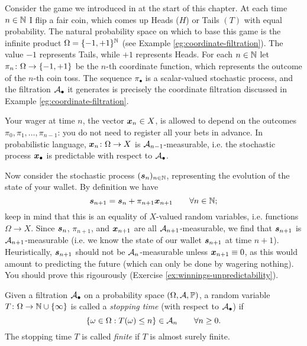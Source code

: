 \begin{example}\label{eg:gambling-filtrations}
  Consider the game we introduced in at the start of this chapter.
  At each time $n \in \mathbb{N}$ I flip a fair coin, which comes up Heads ($H$) or Tails $(T)$ with equal probability.
  The natural probability space on which to base this game is the infinite product $\Omega = \{-1,+1\}^{\mathbb{N}}$ (see Example \ref{eg:coordinate-filtration}).
  The value $-1$ represents Tails, while $+1$ represents Heads.
  For each $n \in \mathbb{N}$ let $\pi_n \colon \Omega \rightarrow \{-1,+1\}$ be the $n$-th coordinate function, which represents the outcome of the $n$-th coin toss.
  The sequence $\pi_{\bullet}$ is a scalar-valued stochastic process, and the filtration $\mathcal{A}_{\bullet}$ it generates is precisely the coordinate filtration discussed in Example \ref{eg:coordinate-filtration}.

  
  Your wager at time $n$, the vector $\bm{x}_n \in X$, is allowed to depend on the outcomes $\pi_0, \pi_1, \ldots, \pi_{n-1}$: you do not need to register all your bets in advance.
  In probabilistic language, $\bm{x}_n \colon \Omega \rightarrow X$ is $\mathcal{A}_{n-1}$-measurable, i.e. the stochastic process $\bm{x}_{\bullet}$ is predictable with respect to $\mathcal{A}_{\bullet}$.

  Now consider the stochastic process $(\bm{s}_n)_{n \in \mathbb{N}}$, representing the evolution of the state of your wallet.
  By definition we have
  \begin{equation*}
    \bm{s}_{n+1} = \bm{s}_n + \pi_{n+1} \bm{x}_{n+1} \qquad \forall n \in \mathbb{N};
  \end{equation*}
  keep in mind that this is an equality of $X$-valued random variables, i.e. functions $\Omega \to X$.
  Since $\bm{s}_n$, $\pi_{n+1}$, and $\bm{x}_{n+1}$ are all $\mathcal{A}_{n+1}$-measurable, we find that $\bm{s}_{n+1}$ is $\mathcal{A}_{n+1}$-measurable (i.e. we know the state of our wallet $\bm{s}_{n+1}$ at time $n+1$).
  Heuristically, $\bm{s}_{n+1}$ should not be $\mathcal{A}_n$-measurable unless $\bm{x}_{n+1} \equiv 0$, as this would amount to predicting the future (which can only be done by wagering nothing).
  You should prove this rigourously (Exercise \ref{ex:winnings-unpredictability}).
\end{example}

\begin{defn}
  Given a filtration $\mathcal{A}_\bullet$ on a probability space $(\Omega, \mathcal{A}, \mathbb{P})$, a random variable $T \colon \Omega \rightarrow \mathbb{N} \cup \{\infty\}$ is called a \emph{stopping time} (with respect to $\mathcal{A}_{\bullet}$) if 
  \begin{equation*}
    \{\omega \in \Omega: T(\omega) \leq n\} \in \mathcal{A}_n \qquad \forall n \geq 0.
  \end{equation*}
  The stopping time $T$ is called \emph{finite} if $T$ is almost surely finite.
\end{defn}

